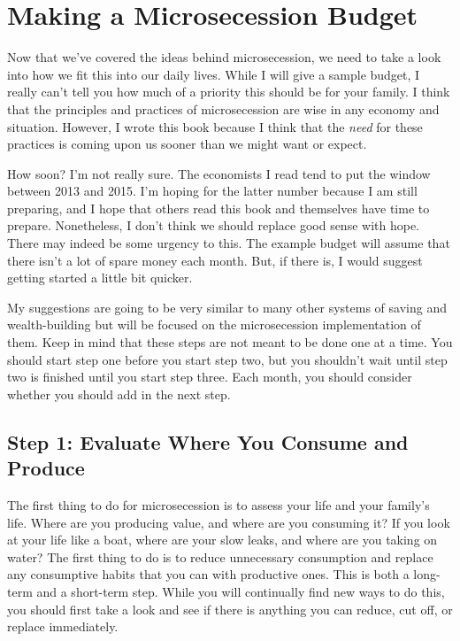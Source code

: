 \chapter{Making a Microsecession Budget}

Now that we've covered the ideas behind microsecession,
we need to take a look into how we fit this into our daily lives. While
I will give a sample budget, I really can't tell you
how much of a priority this should be for your family. I think that the
principles and practices of microsecession are wise in any economy and
situation. However, I wrote this book because I think that the
\textit{need} for these practices is coming upon us sooner than we
might want or expect.

How soon?  I'm not really sure. The economists I read
tend to put the window between 2013 and 2015. I'm
hoping for the latter number because I am still preparing, and I hope
that others read this book and themselves have time to prepare.
Nonetheless, I don't think we should replace good
sense with hope. There may indeed be some urgency to this. The example
budget will assume that there isn't a lot of spare
money each month. But, if there is, I would suggest getting started a
little bit quicker.

My suggestions are going to be very similar to many other systems of
saving and wealth-building but will be focused on the microsecession
implementation of them.
Keep in mind that
these steps are not meant to be done one at a time. You should start
step one before you start step two, but you shouldn't
wait until step two is finished until you start step three. Each month,
you should consider whether you should add in the next step.

\section{Step 1: Evaluate Where You Consume and Produce}

The first thing to do for microsecession is to assess your life and your
family's life. Where are you producing value, and
where are you consuming it?  If you look at your life like a boat,
where are your slow leaks, and where are you taking on water?  The
first thing to do is to reduce unnecessary consumption and replace any
consumptive habits that you can with productive ones. This is both a
long-term and a short-term step. While you will continually find new
ways to do this, you should first take a look and see if there is
anything you can reduce, cut off, or replace immediately.

